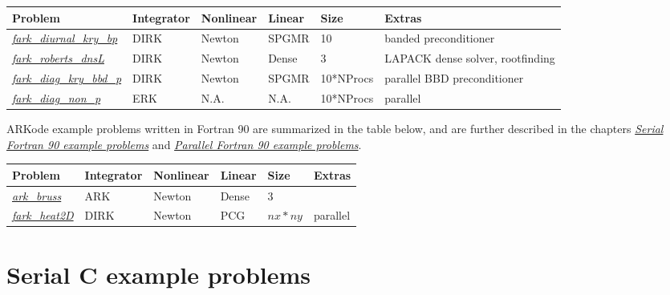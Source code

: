 \documentclass[letterpaper,10pt,english]{sphinxmanual}
\begin{document}
\begin{tabulary}{\linewidth}{|L|L|L|L|L|L|}
\hline
\textbf{\relax 
Problem
} & \textbf{\relax 
Integrator
} & \textbf{\relax 
Nonlinear
} & \textbf{\relax 
Linear
} & \textbf{\relax 
Size
} & \textbf{\relax 
Extras
}\\\hline

{\hyperref[f77_serial:fark-diurnal-kry-bp]{\emph{fark\_diurnal\_kry\_bp}}}
 & 
DIRK
 & 
Newton
 & 
SPGMR
 & 
10
 & 
banded preconditioner
\\\hline

{\hyperref[f77_serial:fark-roberts-dnsl]{\emph{fark\_roberts\_dnsL}}}
 & 
DIRK
 & 
Newton
 & 
Dense
 & 
3
 & 
LAPACK dense solver, rootfinding
\\\hline

{\hyperref[f77_parallel:fark-diag-kry-bbd-p]{\emph{fark\_diag\_kry\_bbd\_p}}}
 & 
DIRK
 & 
Newton
 & 
SPGMR
 & 
10*NProcs
 & 
parallel BBD preconditioner
\\\hline

{\hyperref[f77_parallel:fark-diag-non-p]{\emph{fark\_diag\_non\_p}}}
 & 
ERK
 & 
N.A.
 & 
N.A.
 & 
10*NProcs
 & 
parallel
\\\hline
\end{tabulary}


ARKode example problems written in Fortran 90 are summarized in the table
below, and are further described in the chapters {\hyperref[f90_serial:serial-f90]{\emph{Serial Fortran 90 example problems}}} and
{\hyperref[f90_parallel:parallel-f90]{\emph{Parallel Fortran 90 example problems}}}.

\begin{tabulary}{\linewidth}{|L|L|L|L|L|L|}
\hline
\textbf{\relax 
Problem
} & \textbf{\relax 
Integrator
} & \textbf{\relax 
Nonlinear
} & \textbf{\relax 
Linear
} & \textbf{\relax 
Size
} & \textbf{\relax 
Extras
}\\\hline

{\hyperref[f90_serial:ark-bruss]{\emph{ark\_bruss}}}
 & 
ARK
 & 
Newton
 & 
Dense
 & 
3
 & \\\hline

{\hyperref[f90_parallel:fark-heat2d]{\emph{fark\_heat2D}}}
 & 
DIRK
 & 
Newton
 & 
PCG
 & 
$nx*ny$
 & 
parallel
\\\hline
\end{tabulary}



\chapter{Serial C example problems}
\label{c_serial:serial-c}\label{c_serial::doc}\label{c_serial:arkode-example-documentation}\label{c_serial:serial-c-example-problems}
\end{document}
